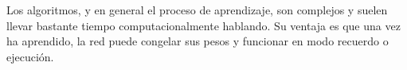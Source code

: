 \documentclass[12pt]{book} %
\begin{document}
			Los algoritmos, y en general el proceso de aprendizaje, son complejos y suelen llevar bastante tiempo computacionalmente hablando. 
			Su ventaja es que una vez ha aprendido, la red puede congelar sus pesos y funcionar en modo recuerdo o ejecución.
			 
			 
			

\newpage

\newpage
\printnoidxglossaries
{}
\end{document}

